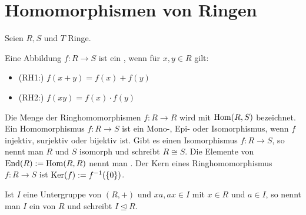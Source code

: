 \section{Homomorphismen von Ringen}

Seien $R,S$ und $T$ Ringe.

\begin{definition}[Ringhomomorphismus]
	Eine Abbildung $f:R\to S$ ist ein , wenn für $x,y\in R$ 
	gilt:
	\begin{itemize}
		\item (RH1:) $f(x+y)=f(x)+f(y)$
		\item (RH2:) $f(xy)=f(x)\cdot f(y)$
	\end{itemize}
	Die Menge der Ringhomomorphismen $f:R\to R$ wird mit $\operatorname{Hom}(R,S)$ bezeichnet. Ein Homomorphismus $f:R\to S$ ist ein 
	Mono-, Epi- oder Isomorphismus, wenn $f$ injektiv, surjektiv oder bijektiv ist. Gibt es einen Isomorphismus 
	$f:R\to S$, so nennt man $R$ und $S$ isomorph und schreibt $R\cong S$. Die Elemente von $\operatorname{End}(R):= \operatorname{Hom}(R,R)$ nennt 
	man . Der Kern eines Ringhomomorphismus $f:R\to S$ ist $\operatorname{Ker}(f):= f^{-1}(\{0\})$.
\end{definition}

\begin{definition}[Ideal]
	Ist $I$ eine Untergruppe von $(R,+)$ und $xa,ax\in I$ mit $x\in R$ und $a\in I$, so nennt 
	man $I$ ein  von $R$ und schreibt $I\unlhd R$.
\end{definition}